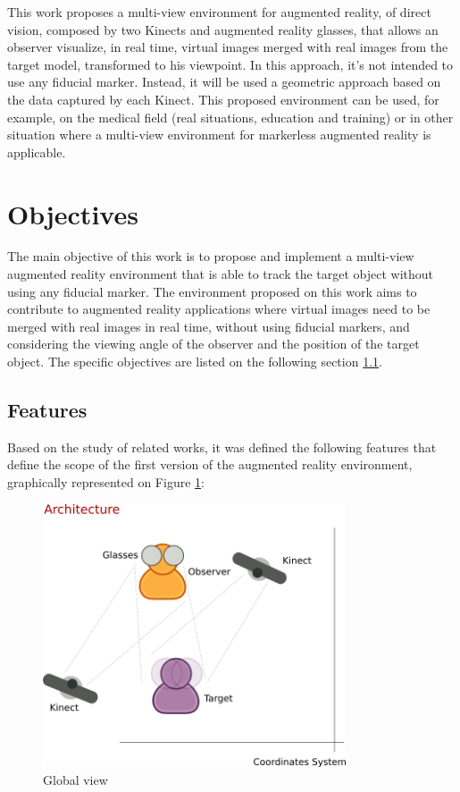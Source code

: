 \documentclass[msc, a4paper, classic, en]{ufbathesis}
\begin{document}
This work proposes a multi-view environment for augmented reality, of direct vision, composed by two Kinects \cite{kinect} and augmented reality glasses, that allows an observer visualize, in real time, virtual images merged with real images from the target model, transformed to his viewpoint. In this approach, it's not intended to use any fiducial marker. Instead, it will be used a geometric approach based on the data captured by each Kinect. This proposed environment can be used, for example, on the medical field (real situations, education and training) or in other situation where a multi-view environment for markerless augmented reality is applicable. 

\section{Objectives}

The main objective of this work is to propose and implement a multi-view augmented reality environment that is able to track the target object without using any fiducial marker. The environment proposed on this work aims to contribute to augmented reality applications where virtual images need to be merged with real images in real time, without using fiducial markers, and considering the viewing angle of the observer and the position of the target object. The specific objectives are listed on the following section \ref{sec:features}.

\subsection{Features}
\label{sec:features}

Based on the study of related works, it was defined the following features that define the scope of the first version of the augmented
reality environment, graphically represented on Figure \ref{fig:diagram}:

\begin{figure}
\centering
\includegraphics[width=0.8\textwidth]{images/diagram.png}
\caption{Global view}
\label{fig:diagram}
\end{figure}
\end{document}
